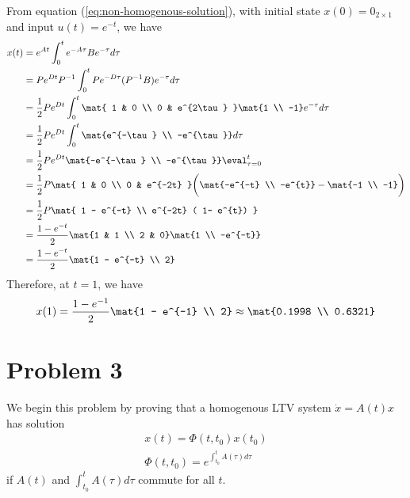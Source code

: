 \documentclass{homework}
\begin{document}
From equation (\ref{eq:non-homogenous-solution}), with initial state
$x(0) = 0_{2 \times 1}$ and input $u(t) = e^{-t}$, we have
\begin{align*}
    x(t) &= e^{At} \int_{0}^{t} e^{-A\tau} B e^{-\tau} d\tau \\
        &= P e^{Dt} P^{-1} \int_{0}^{t} P e^{-D\tau} (P^{-1} B) e^{-\tau} d\tau \\
        &= \frac{1}{2} P e^{Dt} \int_{0}^{t} \mat{
            1 & 0 \\
            0 & e^{2\tau}
        } \mat{1 \\ -1}e^{-\tau} d\tau \\
        &= \frac{1}{2} P e^{Dt} \int_{0}^{t} \mat{e^{-\tau} \\ -e^{\tau}} d\tau \\
        &= \frac{1}{2} P e^{Dt} \mat{-e^{-\tau} \\ -e^{\tau}} \eval_{\tau=0}^t \\
        &= \frac{1}{2} P \mat{
            1 & 0 \\
            0 & e^{-2t}
        } \biggl(
            \mat{-e^{-t} \\ -e^{t}} - \mat{-1 \\ -1}
        \biggr) \\
        &= \frac{1}{2} P \mat{
            1 - e^{-t} \\
            e^{-2t} ( 1- e^{t})
        } \\
        &= \frac{1 - e^{-t}}{2} \mat{1 & 1 \\ 2 & 0}\mat{1 \\ -e^{-t}} \\
        &= \frac{1-e^{-t}}{2} \mat{1 - e^{-t} \\ 2}
\end{align*}
Therefore, at $t=1$, we have
\begin{equation*}
    x(1) = \frac{1 - e^{-1}}{2} \mat{1 - e^{-1} \\ 2} \approx \mat{0.1998 \\ 0.6321}
\end{equation*}

\section{Problem 3}
We begin this problem by proving that a homogenous LTV system $\dot{x} = A(t) x$
has solution
\begin{align}
    x(t) = \Phi(t, t_0) x(t_0) \\
    \Phi(t, t_0) = e^{\int_{t_0}^{t} A(\tau) d\tau}
    \label{eq:ltv-solution}
\end{align}
if $A(t)$ and $\int_{t_0}^{t} A(\tau) d\tau$ commute for all $t$.
\end{document}
